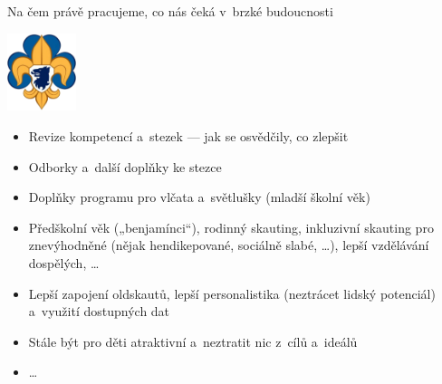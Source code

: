 \documentclass[hyperref={bookmarks=true, unicode=true, colorlinks=true, plainpages=false, pdfkeywords={Skaut, Junak, Skauting, Vychovna metoda}, linkcolor=OrangeRed, anchorcolor=OrangeRed, citecolor=RawSienna, filecolor=RawSienna, menucolor=OrangeRed, urlcolor=RawSienna, pdftex}, compress, xelatex, xcolor=dvipsnames, print]{beamer}
\begin{document}
\begin{frame}{Na čem právě pracujeme, co nás čeká v~brzké budoucnosti}
\begin{center}
\includegraphics[width=2cm]{lilie-cz.png}
\end{center}
\begin{itemize}
 \item Revize kompetencí a~stezek --- jak se osvědčily, co zlepšit
 \item Odborky a~další doplňky ke stezce
 \item Doplňky programu pro vlčata a~světlušky (mladší školní věk)
 \item Předškolní věk („benjamínci“), rodinný skauting, inkluzivní skauting pro znevýhodněné (nějak hendikepované, sociálně slabé, \ldots), lepší vzdělávání dospělých, \ldots
 \item Lepší zapojení oldskautů, lepší personalistika (neztrácet lidský potenciál) a~využití dostupných dat
 \item Stále být pro děti atraktivní a~neztratit nic z~cílů a~ideálů
 \item \ldots
\end{itemize}
\end{frame}
\end{document}
